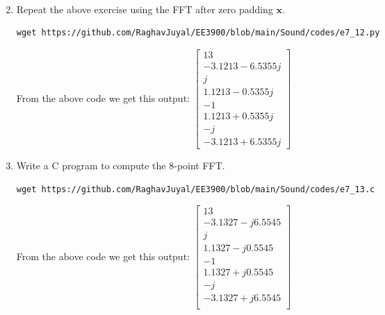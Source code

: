 \documentclass[journal,12pt,twocolumn]{IEEEtran}
\let\vec\mathbf
\renewcommand\thesection{\arabic{section}}
\begin{document}
\begin{enumerate}[label=\arabic*.,ref=\thesection.\theenumi]
\begin{align}
	\end{align}
	\item Repeat the above exercise using the FFT
	after zero padding $\vec{x}$.\\
	\solution
	\begin{lstlisting}
wget https://github.com/RaghavJuyal/EE3900/blob/main/Sound/codes/e7_12.py
	\end{lstlisting}
	From the above code we get this output:
	$\begin{bmatrix}
		13\\
		-3.1213-6.5355j\\
		j\\
		1.1213-0.5355j\\
		-1\\
		1.1213+0.5355j\\
		-j\\
		-3.1213+6.5355j
	\end{bmatrix}$
	\item Write a C program to compute the 8-point FFT. \\
	\solution
	\begin{lstlisting}
wget https://github.com/RaghavJuyal/EE3900/blob/main/Sound/codes/e7_13.c
	\end{lstlisting}
	From the above code we get this output:
	$\begin{bmatrix}
		13\\
		-3.1327 - j6.5545\\
		j\\
		1.1327 - j0.5545\\
		-1\\
		1.1327 + j0.5545\\
		- j\\
		-3.1327 + j6.5545\\
	\end{bmatrix}$
	\vspace{1cm}
\end{enumerate}
\end{document}
